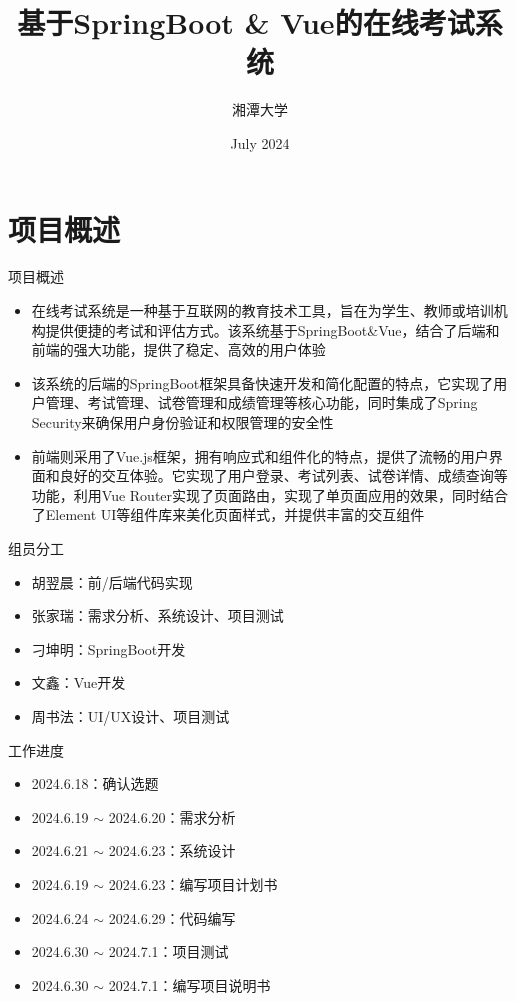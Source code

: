 \documentclass{beamer}
\title{基于SpringBoot \& Vue的在线考试系统}
\author{湘潭大学}
\date{July 2024}
\begin{document}
\maketitle
\section{项目概述}
\begin{frame}{项目概述}
\begin{itemize}
    \item 在线考试系统是一种基于互联网的教育技术工具，旨在为学生、教师或培训机构提供便捷的考试和评估方式。该系统基于SpringBoot\&Vue，结合了后端和前端的强大功能，提供了稳定、高效的用户体验
    \item 该系统的后端的SpringBoot框架具备快速开发和简化配置的特点，它实现了用户管理、考试管理、试卷管理和成绩管理等核心功能，同时集成了Spring Security来确保用户身份验证和权限管理的安全性
    \item 前端则采用了Vue.js框架，拥有响应式和组件化的特点，提供了流畅的用户界面和良好的交互体验。它实现了用户登录、考试列表、试卷详情、成绩查询等功能，利用Vue Router实现了页面路由，实现了单页面应用的效果，同时结合了Element UI等组件库来美化页面样式，并提供丰富的交互组件
\end{itemize}
\end{frame}
\begin{frame}{组员分工}
    \begin{itemize}
        \item 胡翌晨：前/后端代码实现
        \item 张家瑞：需求分析、系统设计、项目测试
        \item 刁坤明：SpringBoot开发
        \item 文鑫：Vue开发
        \item 周书法：UI/UX设计、项目测试
    \end{itemize}
\end{frame}
\begin{frame}{工作进度}
    \begin{itemize}
    \item 2024.6.18：确认选题
    \item 2024.6.19 $\sim$ 2024.6.20：需求分析
    \item 2024.6.21 $\sim$ 2024.6.23：系统设计
    \item 2024.6.19 $\sim$ 2024.6.23：编写项目计划书
    \item 2024.6.24 $\sim$ 2024.6.29：代码编写
    \item 2024.6.30 $\sim$ 2024.7.1：项目测试
    \item 2024.6.30 $\sim$ 2024.7.1：编写项目说明书
    \end{itemize}
\end{frame}
\end{document}
